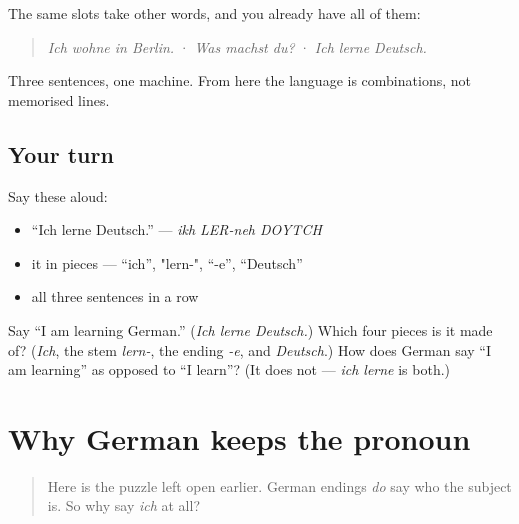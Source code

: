 \begin{grammarlens}[title={Grammar Lens: swap the pieces}]
The same slots take other words, and you already have all of them:

\begin{quote}
\emph{Ich wohne in Berlin.} · \emph{Was machst du?} · \emph{Ich lerne Deutsch.}
\end{quote}

Three sentences, one machine. From here the language is combinations, not memorised lines.
\end{grammarlens}

\subsection*{Your turn}
Say these aloud:

\begin{itemize}
\raggedright
  \item \textquotedblleft{}Ich lerne Deutsch.\textquotedblright{} — \emph{ikh LER-neh DOYTCH}
  \item it in pieces — \textquotedblleft{}ich\textquotedblright{}, "lern-", \textquotedblleft{}-e\textquotedblright{}, \textquotedblleft{}Deutsch\textquotedblright{}
  \item all three sentences in a row
\end{itemize}

\begin{tcolorbox}[breakable,colback=teal!4,colframe=teal!35!black,title={Before you move on}]
Say \textquotedblleft{}I am learning German.\textquotedblright{} (\emph{Ich lerne Deutsch.}) Which four pieces is it made of? (\emph{Ich}, the stem \emph{lern-}, the ending \emph{-e}, and \emph{Deutsch}.) How does German say \textquotedblleft{}I am learning\textquotedblright{} as opposed to \textquotedblleft{}I learn\textquotedblright{}? (It does not — \emph{ich lerne} is both.)
\end{tcolorbox}
\section[(the overt subject)]{Why German keeps the pronoun}

\label{lesson:GE-C05-pronomen-regel}



\begin{quote}
Here is the puzzle left open earlier. German endings \emph{do} say who the subject is. So why say \emph{ich} at all?
\end{quote}

